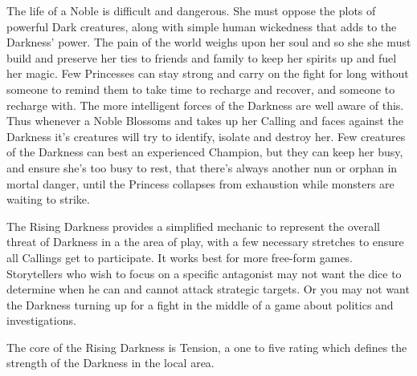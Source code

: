 \label{RisingDarkness}
The life of a Noble is difficult and dangerous. She must oppose the plots of powerful Dark creatures, along with simple human wickedness that adds to the Darkness’ power. The pain of the world weighs upon her soul and so she she must build and preserve her ties to friends and family to keep her spirits up and fuel her magic. Few Princesses can stay strong and carry on the fight for long without someone to remind them to take time to recharge and recover, and someone to recharge with. The more intelligent forces of the Darkness are well aware of this. Thus whenever a Noble Blossoms and takes up her Calling and faces against the Darkness it's creatures will try to identify, isolate and destroy her. Few creatures of the Darkness can best an experienced Champion, but they can keep her busy, and ensure she's too busy to rest, that there's always another nun or orphan in mortal danger, until the Princess collapses from exhaustion while monsters are waiting to strike. 

The Rising Darkness provides a simplified mechanic to represent the overall threat of Darkness in a the area of play, with a few necessary stretches to ensure all Callings get to participate. It works best for more free-form games. Storytellers who wish to focus on a specific antagonist may not want the dice to determine when he can and cannot attack strategic targets. Or you may not want the Darkness turning up for a fight in the middle of a game about politics and investigations. 

The core of the Rising Darkness is Tension, a one to five rating which defines the strength of the Darkness in the local area. 


